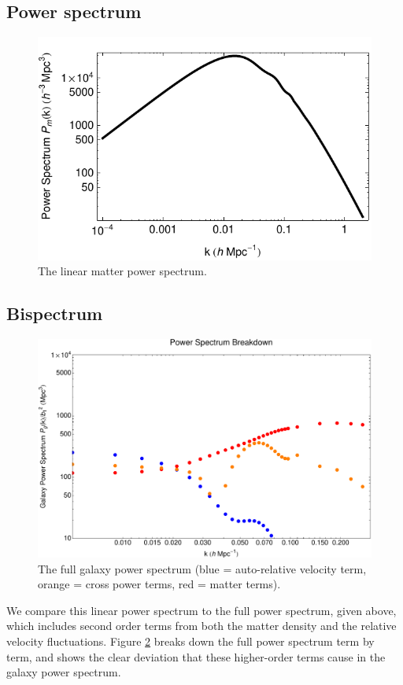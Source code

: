 \documentclass[12pt]{article}
\begin{document}
\subsection{Power spectrum}
\begin{figure}[H]
	\centering
	\includegraphics[width=12cm]{Pm}
	\caption{The linear matter power spectrum.}
	\label{Pm}
\end{figure}

\subsection{Bispectrum}
\begin{figure}[H]
	\centering
	\includegraphics[width=13cm]{PSbd}
	\caption{The full galaxy power spectrum (blue = auto-relative velocity term, orange = cross power terms, red = matter terms).}
	\label{PSbd}
\end{figure}

We compare this linear power spectrum to the full power spectrum, given above, which includes second order terms from both the matter density and the relative velocity fluctuations. Figure \ref{PSbd} breaks down the full power spectrum term by term, and shows the clear deviation that these higher-order terms cause in the galaxy power spectrum. 
\end{document}
